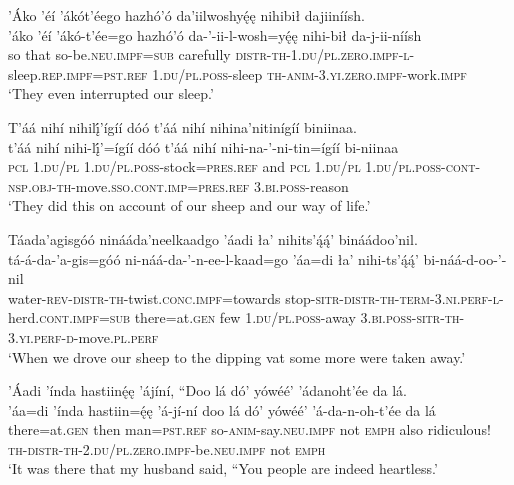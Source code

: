 \ea\label{ex:text8-2-5}
’Áko ’éí ’ákót’éego hazhó’ó da’iilwoshyę́ę nihibił dajiiníísh.\\
\gll ’áko	’éí	’ákó-t’ée=go	hazhó’ó	da-’-ii-l-wosh=yę́ę	nihi-bił	da-j-ii-níísh\\
     so	that	so-be.\textsc{neu}.\textsc{impf}=\textsc{sub}	carefully	\textsc{distr}-\textsc{th}-1.\textsc{du}/\textsc{pl}.\textsc{zero}.\textsc{impf}-\textsc{l}-sleep.\textsc{rep}.\textsc{impf}=\textsc{pst}.\textsc{ref}	1.\textsc{du}/\textsc{pl}.\textsc{poss}-sleep	\textsc{th}-\textsc{anim}-3.\textsc{yi}.\textsc{zero}.\textsc{impf}-work.\textsc{impf}\\
\glt `They even interrupted our sleep.'
\z

\ea\label{ex:text8-2-6}
T’áá nihí nihilį́’ígíí dóó t’áá nihí nihina’nitinígíí biniinaa.\\
\gll t’áá nihí	nihi-lį́’=ígíí	dóó	t’áá nihí	nihi-na-’-ni-tin=ígíí	bi-niinaa\\
     \textsc{pcl} 1.\textsc{du}/\textsc{pl}	1.\textsc{du}/\textsc{pl}.\textsc{poss}-stock=\textsc{pres}.\textsc{ref}	and	\textsc{pcl} 1.\textsc{du}/\textsc{pl}	1.\textsc{du}/\textsc{pl}.\textsc{poss}-\textsc{cont}-\textsc{nsp}.\textsc{obj}-\textsc{th}-move.\textsc{sso}.\textsc{cont}.\textsc{imp}=\textsc{pres}.\textsc{ref}	3.\textsc{bi}.\textsc{poss}-reason\\
\glt `They did this on account of our sheep and our way of life.'
\z

\ea\label{ex:text8-2-7}
Táada’agisgóó ninááda’neelkaadgo ’áadi ła’ nihits’ą́ą́’ bináádoo’nil.\\
\gll tá-á-da-’a-gis=góó	ni-náá-da-’-n-ee-l-kaad=go	’áa=di	ła’	nihi-ts’ą́ą́’	bi-náá-d-oo-’-nil\\
     water-\textsc{rev}-\textsc{distr}-\textsc{th}-twist.\textsc{conc}.\textsc{impf}=towards	stop-\textsc{sitr}-\textsc{distr}-\textsc{th}-\textsc{term}-3.\textsc{ni}.\textsc{perf}-\textsc{l}-herd.\textsc{cont}.\textsc{impf}=\textsc{sub}	there=at.\textsc{gen}	few	1.\textsc{du}/\textsc{pl}.\textsc{poss}-away	3.\textsc{bi}.\textsc{poss}-\textsc{sitr}-\textsc{th}-3.\textsc{yi}.\textsc{perf}-\textsc{d}-move.\textsc{pl}.\textsc{perf}\\
\glt `When we drove our sheep to the dipping vat some more were taken away.'
\z

\ea\label{ex:text8-2-8}
’Áadi ’índa hastiinę́ę ’ájíní, ``Doo lá dó’ yówéé’ ’ádanoht’ée da lá.\\
\gll ’áa=di	’índa	hastiin=ę́ę	’á-jí-ní	doo	lá	dó’	yówéé’	’á-da-n-oh-t’ée	da	lá\\
     there=at.\textsc{gen}	then	man=\textsc{pst}.\textsc{ref}	so-\textsc{anim}-say.\textsc{neu}.\textsc{impf}	not	\textsc{emph}	also	ridiculous!	\textsc{th}-\textsc{distr}-\textsc{th}-2.\textsc{du}/\textsc{pl}.\textsc{zero}.\textsc{impf}-be.\textsc{neu}.\textsc{impf}	not	\textsc{emph}\\
\glt `It was there that my husband said, ``You people are indeed heartless.'
\z

